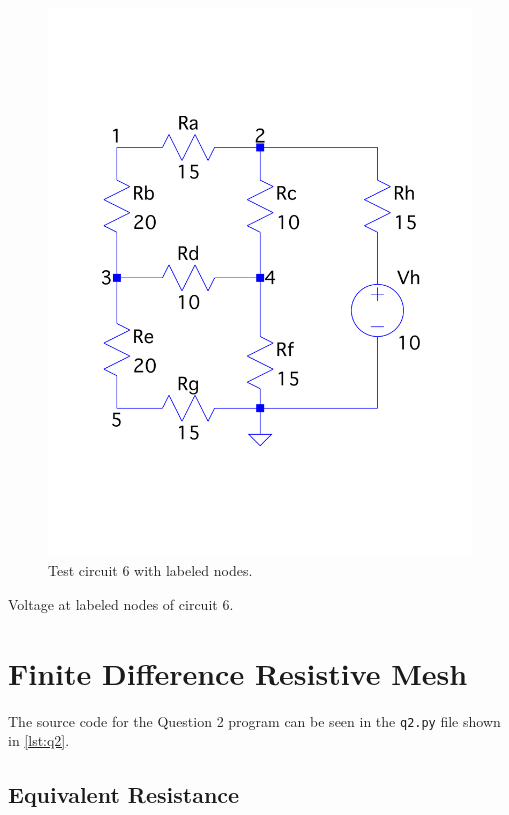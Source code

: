 \documentclass[a4paper,titlepage]{article}
\begin{document}
	\begin{figure}[!htb]
		\centering
		\includegraphics[width=0.75\columnwidth]{plots/q1_circuit_6.pdf}
		\caption
		{Test circuit 6 with labeled nodes.}
		\label{fig:q1_circuit_6}
	\end{figure}

	\begin{table}[!htb]
		\centering
		\caption{Voltage at labeled nodes of circuit 6.}
		\label{table:q1_circuit_6}
	\end{table}
	
	\section{Finite Difference Resistive Mesh}
	
	The source code for the Question 2 program can be seen in the \texttt{q2.py} file shown in \autoref{lst:q2}.
	
	\subsection{Equivalent Resistance}
	
\end{document}
